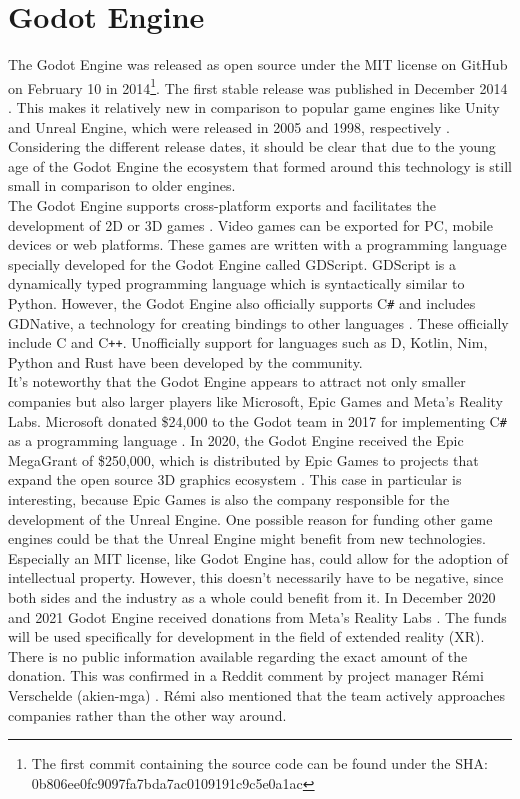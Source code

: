 \section{Godot Engine}
The Godot Engine was released as open source under the MIT license on GitHub on February 10 in 2014\footnote{The first commit containing the source code can be found under the SHA:\\ 0b806ee0fc9097fa7bda7ac0109191c9c5e0a1ac}\cite{godot-repository}.
The first stable release was published in December 2014 \cite{godot-release}.
This makes it relatively new in comparison to popular game engines like Unity and Unreal Engine, which were released in 2005 and 1998, respectively \cite{unity-release, unreal-release}.
Considering the different release dates, it should be clear that due to the young age of the Godot Engine the ecosystem that formed around this technology is still small in comparison to older engines.\\

The Godot Engine supports cross-platform exports and facilitates the development of 2D or 3D games \cite{godot-engine}.
Video games can be exported for PC, mobile devices or web platforms.
These games are written with a programming language specially developed for the Godot Engine called GDScript.
GDScript is a dynamically typed programming language which is syntactically similar to Python.
However, the Godot Engine also officially supports C\texttt{\#} and includes GDNative, a technology for creating bindings to other languages \cite{godot-gdnative}.
These officially include C and C\texttt{++}.
Unofficially support for languages such as D, Kotlin, Nim, Python and Rust have been developed by the community.\\

It's noteworthy that the Godot Engine appears to attract not only smaller companies but also larger players like Microsoft, Epic Games and Meta's Reality Labs.
Microsoft donated \$24,000 to the Godot team in 2017 for implementing C\texttt{\#} as a programming language \cite{godot-csharp}.
In 2020, the Godot Engine received the Epic MegaGrant of \$250,000, which is distributed by Epic Games to projects that expand the open source 3D graphics ecosystem \cite{godot-megagrant}.
This case in particular is interesting, because Epic Games is also the company responsible for the development of the Unreal Engine.
One possible reason for funding other game engines could be that the Unreal Engine might benefit from new technologies.
Especially an MIT license, like Godot Engine has, could allow for the adoption of intellectual property. 
However, this doesn't necessarily have to be negative, since both sides and the industry as a whole could benefit from it.
In December 2020 and 2021 Godot Engine received donations from Meta's Reality Labs \cite{godot-facebook-reality, godot-meta-reality}.
The funds will be used specifically for development in the field of extended reality (XR).
There is no public information available regarding the exact amount of the donation.
This was confirmed in a Reddit comment by project manager Rémi Verschelde (akien-mga) \cite{reddit-companies-akien}.
Rémi also mentioned that the team actively approaches companies rather than the other way around.
